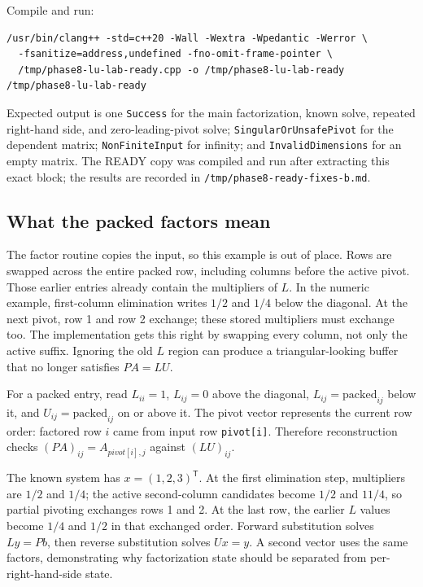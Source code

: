 Compile and run:

\begin{verbatim}
/usr/bin/clang++ -std=c++20 -Wall -Wextra -Wpedantic -Werror \
  -fsanitize=address,undefined -fno-omit-frame-pointer \
  /tmp/phase8-lu-lab-ready.cpp -o /tmp/phase8-lu-lab-ready
/tmp/phase8-lu-lab-ready
\end{verbatim}

Expected output is one \texttt{Success} for the main factorization, known solve, repeated right-hand side, and zero-leading-pivot solve; \texttt{SingularOrUnsafePivot} for the dependent matrix; \texttt{NonFiniteInput} for infinity; and \texttt{InvalidDimensions} for an empty matrix. The READY copy was compiled and run after extracting this exact block; the results are recorded in \texttt{/tmp/phase8-ready-fixes-b.md}.

\subsection{What the packed factors mean}\label{01-foundations-i-ch019-what-the-packed-factors-mean}

The factor routine copies the input, so this example is out of place. Rows are swapped across the entire packed row, including columns before the active pivot. Those earlier entries already contain the multipliers of \(L\). In the numeric example, first-column elimination writes \(1/2\) and \(1/4\) below the diagonal. At the next pivot, row 1 and row 2 exchange; these stored multipliers must exchange too. The implementation gets this right by swapping every column, not only the active suffix. Ignoring the old \(L\) region can produce a triangular-looking buffer that no longer satisfies \(PA=LU\).

For a packed entry, read \(L_{ii}=1\), \(L_{ij}=0\) above the diagonal, \(L_{ij}=\text{packed}_{ij}\) below it, and \(U_{ij}=\text{packed}_{ij}\) on or above it. The pivot vector represents the current row order: factored row \(i\) came from input row \texttt{pivot{[}i{]}}. Therefore reconstruction checks \((PA)_{ij}=A_{pivot[i],j}\) against \((LU)_{ij}\).

The known system has \(x=(1,2,3)^\mathsf T\). At the first elimination step, multipliers are \(1/2\) and \(1/4\); the active second-column candidates become \(1/2\) and \(11/4\), so partial pivoting exchanges rows 1 and 2. At the last row, the earlier \(L\) values become \(1/4\) and \(1/2\) in that exchanged order. Forward substitution solves \(Ly=Pb\), then reverse substitution solves \(Ux=y\). A second vector uses the same factors, demonstrating why factorization state should be separated from per-right-hand-side state.

